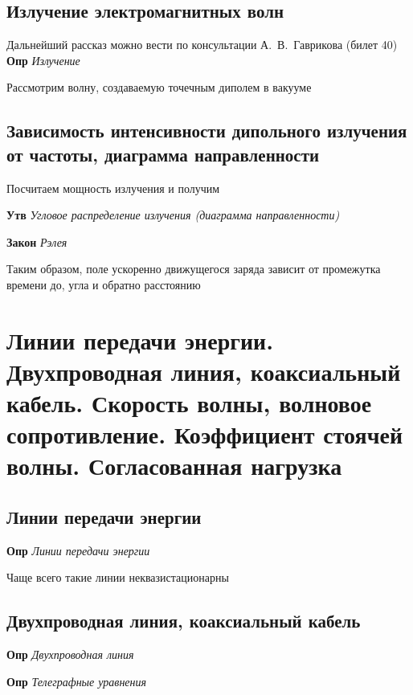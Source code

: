 \documentclass[a4paper, 14pt]{article}
\begin{document}
    \subsection{Излучение электромагнитных волн}
    
    Дальнейший рассказ можно вести по консультации А.~В.~Гаврикова (билет 40) \\
    
    \textbf{Опр} \textit{Излучение}
    
    Рассмотрим волну, создаваемую точечным диполем в вакууме
    
    \subsection{Зависимость интенсивности дипольного излучения от частоты, диаграмма направленности}
    
    Посчитаем мощность излучения и получим
    
    \textbf{Утв} \textit{Угловое распределение излучения (диаграмма направленности)}
    
    \textbf{Закон} \textit{Рэлея}
    
    Таким образом, поле ускоренно движущегося заряда зависит от промежутка времени до, угла и обратно расстоянию
    
    \section{Линии передачи энергии.
    Двухпроводная линия, коаксиальный кабель.
    Скорость волны, волновое сопротивление.
    Коэффициент стоячей волны.
    Согласованная нагрузка}
    
    \subsection{Линии передачи энергии}
    
    \textbf{Опр} \textit{Линии передачи энергии}
    
    Чаще всего такие линии неквазистационарны
    
    \subsection{Двухпроводная линия, коаксиальный кабель}
    
    \textbf{Опр} \textit{Двухпроводная линия}
    
    \textbf{Опр} \textit{Телеграфные уравнения}
    
\end{document}
